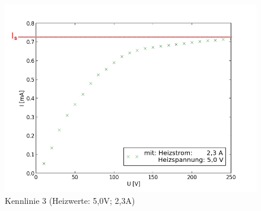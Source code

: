 	\begin{figure}[h]
		\begin{center}
		\includegraphics[scale=0.75]{pica3.jpg}
		\caption{Kennlinie 3 (Heizwerte: 5,0V; 2,3A)}
		\label{pica3}
		\end{center}	
	\end{figure}